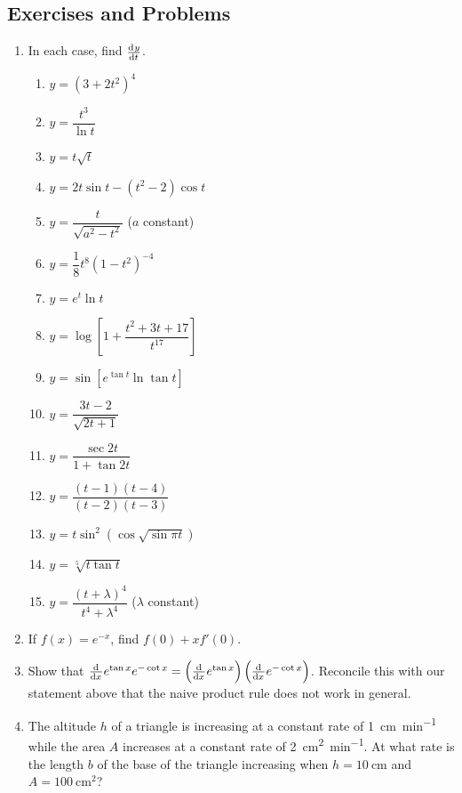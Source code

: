 \subsection{Exercises and Problems}
\begin{enumerate}
  \item In each case, find $ \od{y}{t} $.
    \begin{multicols}{2}
    \begin{enumerate}
      \item $ y = \left(3 + 2t^2\right)^4 $
      \item $ y = \dfrac{t^3}{\ln t} $
      \item $ y = t\sqrt{t} $
      \item $ y = 2t \sin t - (t^2 - 2) \cos t $
      \item $ y = \dfrac{t}{\sqrt{a^2 - t^2}} $ ($ a $ constant)
      \item $ y = \dfrac{1}{8} t^8 \left(1 - t^2\right)^{-4} $
      \item $ y = e^t \ln t $
      \item $ y = \log \left[1 + \dfrac{t^2 + 3t + 17}{t^{17}}\right] $
      \item $ y = \sin \left[e^{\tan t} \ln \tan t\right] $
      \item $ y = \dfrac{3t - 2}{\sqrt{2t + 1}} $
      \item $ y = \dfrac{\sec 2t}{1 + \tan 2t} $
      \item $ y = \dfrac{(t - 1)(t - 4)}{(t - 2)(t - 3)} $
      \item $ y = t \sin^2(\cos \sqrt{\sin \pi t}) $
      \item $ y = \sqrt[5]{t \tan t} $
      \item $ y = \dfrac{(t + \lambda)^4}{t^4 + \lambda^4} $ ($\lambda $ constant)
    \end{enumerate}
    \end{multicols}
  \item If $ f(x) = e^{-x} $, find $ f(0) + xf'(0) $.
  \item Show that $ \od{}{x} e^{\tan x} e^{-\cot x} = \left(\od{}{x}e^{\tan x}\right)\left(\od{}{x}e^{-\cot x}\right) $. Reconcile
        this with our statement above that the naive product rule does not work in general.
  \item The altitude $ h $ of a triangle is increasing at a constant rate of \SI{1}{\centi\metre\per\minute} while
        the area $ A $ increases at a constant rate of \SI{2}{\centi\metre\squared\per\minute}. At what rate
        is the length $ b $ of the base of the triangle increasing when $ h = \SI{10}{\centi\metre} $ and $ A = \SI{100}{\centi\metre\squared} $?

\end{enumerate}

